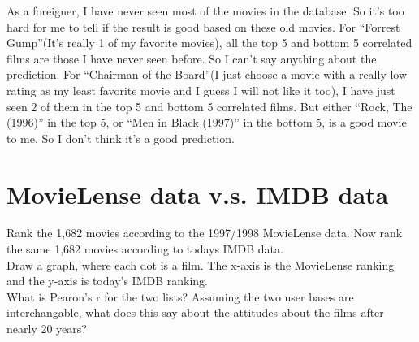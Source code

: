 \documentclass{article}
\begin{document}
		As a foreigner, I have never seen most of the movies in the database. So it's too hard for me to tell if the result is good based on these old movies. For ``Forrest Gump''(It's really 1 of my favorite movies), all the top 5 and bottom 5 correlated films are those I have never seen before. So I can't say anything about the prediction. For ``Chairman of the Board''(I just choose a movie with a really low rating as my least favorite movie and I guess I will not like it too), I have just seen 2 of them in the top 5 and bottom 5 correlated films. But either ``Rock, The (1996)'' in the top 5, or ``Men in Black (1997)'' in the bottom 5, is a good movie to me. So I don't think it's a good prediction.\\
		\section{MovieLense data v.s. IMDB data}
		Rank the 1,682 movies according to the 1997/1998 MovieLense data. Now rank the same 1,682 movies according to todays IMDB data.\\
		\indent Draw a graph, where each dot is a film. The x-axis is the MovieLense ranking and the y-axis is today's IMDB ranking.\\
		\indent What is Pearon's r for the two lists? Assuming the two user bases are interchangable, what does this say about the attitudes about the films after nearly 20 years?\\
\end{document}
